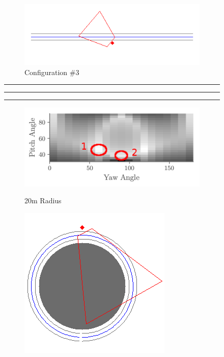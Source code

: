 \documentclass[a4paper,12pt,twoside,openright]{report}
\begin{document}
\begin{figure}[h!]
\begin{subfigure}[b]{0.49\textwidth}
\end{subfigure}
\begin{subfigure}[b]{0.49\textwidth}
    \centering
    \includegraphics[width=\textwidth]{figures/simple_objective/0_curvature_pos3_small.png}
    \caption{Configuration \#3}
\end{subfigure}
\hrule
\hrule
\hrule

\begin{subfigure}[b]{0.42\textwidth}
    \centering
    \includegraphics[width=\textwidth]{figures/simple_objective/pitch_yaw_at_radius_20_annotated.png}
    \label{fig:simpleobjective:0curvature}
    \caption{20m Radius}
\end{subfigure}
\begin{subfigure}[b]{0.28\textwidth}
    \centering
    \includegraphics[width=\textwidth]{figures/simple_objective/radius_20m_pos1_small.png}

\end{subfigure}
\end{figure}
\end{document}
